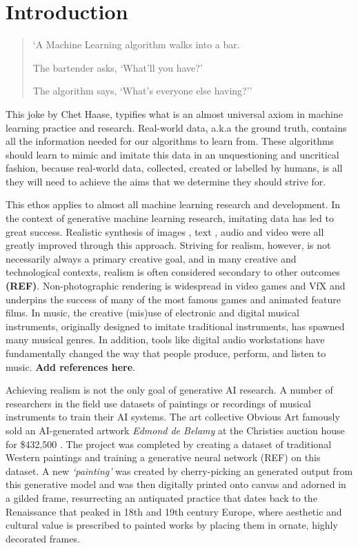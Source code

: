 \chapter{Introduction}
\label{ch:intro}

\begin{quote}

`A Machine Learning algorithm walks into a bar.

The bartender asks, `What'll you have?'

The algorithm says, `What's everyone else having?'' \citep{haase2017bar} \end{quote}

This joke by Chet Haase, typifies what is an almost universal axiom in machine learning practice and research. 
Real-world data, a.k.a the ground truth, contains all the information needed for our algorithms to learn from. 
These algorithms should learn to mimic and imitate this data in an unquestioning and uncritical fashion, because real-world data, collected, created or labelled by humans, is all they will need to achieve the aims that we determine they should strive for.

This ethos applies to almost all machine learning research and development. In the context of generative machine learning research, imitating data has led to great success. 
Realistic synthesis of images \citep{karras2019style}, text \citep{radford2018improving}, audio \citep{oord2016wavenet} and video \citep{openai2024sora} were all greatly improved through this approach. 
Striving for realism, however, is not necessarily always a primary creative goal, and in many creative and technological contexts, realism is often considered secondary to other outcomes \textbf{(REF)}. 
Non-photographic rendering is widespread in video games and VfX and underpins the success of many of the most famous games and animated feature films. 
In music, the creative (mis)use of electronic and digital musical instruments, originally designed to imitate traditional instruments, has spawned many musical genres. In addition, tools like digital audio workstations have fundamentally changed the way that people produce, perform, and listen to music.
\textbf{Add references here}.

Achieving realism is not the only goal of generative AI research. 
A number of researchers in the field use datasets of paintings or recordings of musical instruments to train their AI systems. 
The art collective Obvious Art famously sold an AI-generated artwork \textit{Edmond de Belamy} at the Christies auction house for \$432,500 \citep{christies2018edmond}.
The project was completed by creating a dataset of traditional Western paintings and training a generative neural network (REF) on this dataset. 
A new \textit{`painting’} was created by cherry-picking an generated output from this generative model and was then digitally printed onto canvas and adorned in a gilded frame, resurrecting an antiquated practice that dates back to the Renaissance that peaked in 18th and 19th century Europe, where aesthetic and cultural value is prescribed to painted works by placing them in ornate, highly decorated frames.

